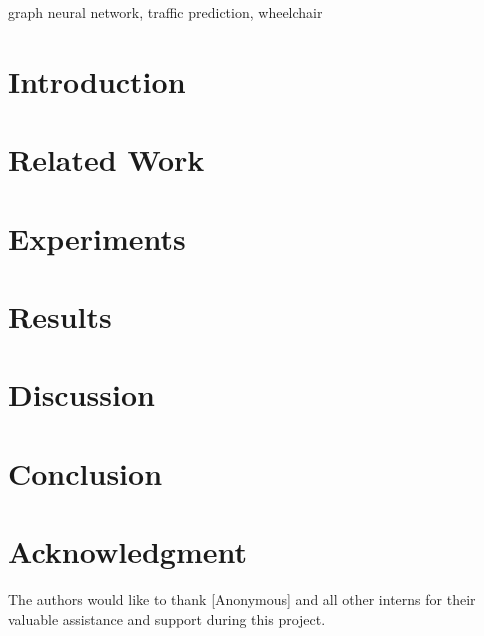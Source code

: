 \documentclass[conference]{IEEEtran}
\begin{document}
    \begin{IEEEkeywords}
        graph neural network, traffic prediction, wheelchair
    \end{IEEEkeywords}


    \section{Introduction}\label{sec:introduction}
    


    \section{Related Work}\label{sec:related-work}
    


    \section{Experiments}\label{sec:experiments}
    


    \section{Results}\label{sec:results}
    


    \section{Discussion}\label{sec:discussion}
    


    \section{Conclusion}\label{sec:conclusion}
    

    \section*{Acknowledgment}
    The authors would like to thank [Anonymous] and all other interns for their valuable assistance and support during this project.

    
    
\end{document}
